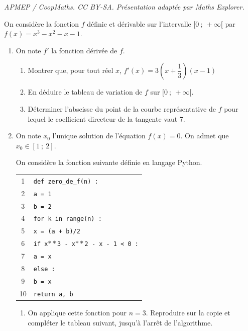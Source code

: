 \documentclass[10pt]{article}
\providecommand{\blue}{\color{blue}}
\providecommand{\blue}{\color{blue}}
\begin{document}
\noindent\textit{APMEP / CoopMaths. CC BY-SA. Présentation adaptée par Maths Explorer.}\par\medskip
\medskip
On considère la fonction $f$ définie et dérivable sur l'intervalle $[0~;~ +\infty[$ par $f(x) =x^3 -x^2 -x-1$.

\medskip

\begin{enumerate}
\item On note $f'$ la fonction dérivée de $f$.
	\begin{enumerate}
		\item Montrer que, pour tout réel $x$,\: $f'(x) = 3\left(x + \dfrac{1}{3}\right)(x - 1)$
		\item En déduire le tableau de variation de $f$ sur $[0~;~ +\infty[$.
		\item Déterminer l'abscisse du point de la courbe représentative de $f$ pour lequel le
coefficient directeur de la tangente vaut $7$.
	\end{enumerate}
\item On note $x_0$ l'unique solution de l'équation $f(x) = 0$. On admet que $x_0 \in [1~;~2]$.

 On considère la fonction suivante définie en langage Python.
 
 \begin{center}
 \begin{tabularx}{0.55\linewidth}{|c X|}\hline
1& \texttt{{\blue def} zero\_de\_f(n) :}\\
2& \texttt{a = 1}\\
3& \texttt{b = 2}\\
4&\texttt{{\blue for} k {\blue in range}(n) :}\\
5&\quad\texttt{x = (a + b)/2}\\
6&\quad\texttt{{\blue if} x$**$3 - x$**$2 - x - 1 < 0 :}\\
7&\qquad\texttt{a = x}\\
8&\quad\texttt{{\blue else} :}\\ 
9&\qquad\texttt{b = x}\\
10&\texttt{{\blue return} a, b}\\ \hline
\end{tabularx}
\end{center}

	\begin{enumerate}
		\item On applique cette fonction pour $n = 3$. Reproduire sur la copie et compléter le tableau suivant, jusqu'à l'arrêt de l'algorithme.
		

\end{enumerate}
\end{enumerate}
\end{document}
